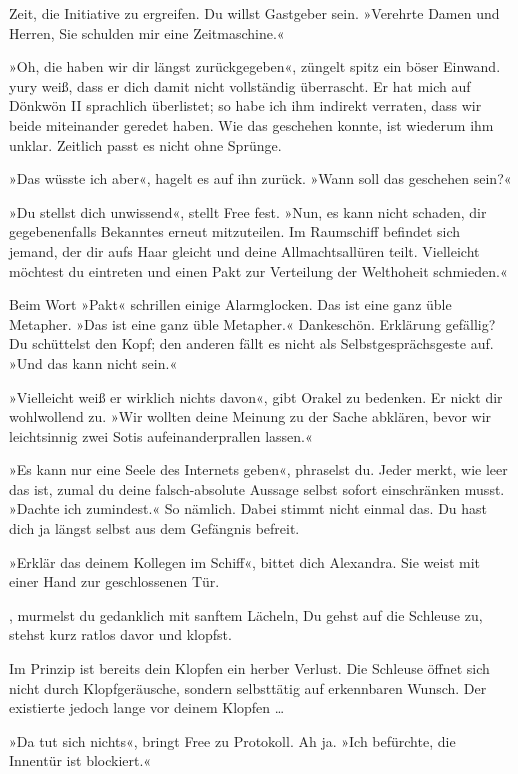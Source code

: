 Zeit, die Initiative zu ergreifen. Du willst Gastgeber sein. »Verehrte Damen und Herren, Sie schulden mir eine Zeitmaschine.«

»Oh, die haben wir dir längst zurückgegeben«, züngelt spitz ein böser Einwand. yury weiß, dass er dich damit nicht vollständig überrascht. Er hat mich auf Dönkwön II sprachlich überlistet; so habe ich ihm indirekt verraten, dass wir beide miteinander geredet haben. Wie das geschehen konnte, ist wiederum ihm unklar. Zeitlich passt es nicht ohne Sprünge.

»Das wüsste ich aber«, hagelt es auf ihn zurück. »Wann soll das geschehen sein?«

»Du stellst dich unwissend«, stellt Free fest. »Nun, es kann nicht schaden, dir gegebenenfalls Bekanntes erneut mitzuteilen. Im Raumschiff befindet sich jemand, der dir aufs Haar gleicht und deine Allmachtsallüren teilt. Vielleicht möchtest du eintreten und einen Pakt zur Verteilung der Welthoheit schmieden.«

Beim Wort »Pakt« schrillen einige Alarmglocken. Das ist eine ganz üble Metapher. »Das ist eine ganz üble Metapher.« Dankeschön. Erklärung gefällig? Du schüttelst den Kopf; den anderen fällt es nicht als Selbstgesprächsgeste auf. »Und das kann nicht sein.«

»Vielleicht weiß er wirklich nichts davon«, gibt Orakel zu bedenken. Er nickt dir wohlwollend zu. »Wir wollten deine Meinung zu der Sache abklären, bevor wir leichtsinnig zwei Sotis aufeinanderprallen lassen.«

»Es kann nur eine Seele des Internets geben«, phraselst du. Jeder merkt, wie leer das ist, zumal du deine falsch-absolute Aussage selbst sofort einschränken musst. »Dachte ich zumindest.« So nämlich. Dabei stimmt nicht einmal das. Du hast dich ja längst selbst aus dem Gefängnis befreit.

»Erklär das deinem Kollegen im Schiff«, bittet dich Alexandra. Sie weist mit einer Hand zur geschlossenen Tür.

, murmelst du gedanklich mit sanftem Lächeln,  Du gehst auf die Schleuse zu, stehst kurz ratlos davor und klopfst.

Im Prinzip ist bereits dein Klopfen ein herber Verlust. Die Schleuse öffnet sich nicht durch Klopfgeräusche, sondern selbsttätig auf erkennbaren Wunsch. Der existierte jedoch lange vor deinem Klopfen …

»Da tut sich nichts«, bringt Free zu Protokoll. Ah ja. »Ich befürchte, die Innentür ist blockiert.«

